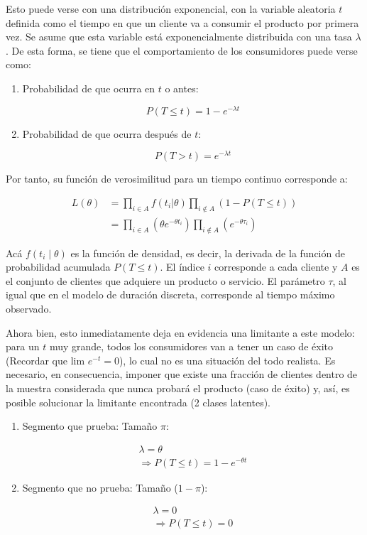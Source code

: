 \documentclass[
]{book}
\begin{document}
Esto puede verse con una distribución exponencial, con la variable
aleatoria \(t\) definida como el tiempo en que un cliente va a consumir el
producto por primera vez. Se asume que esta variable está
exponencialmente distribuida con una tasa \(\lambda\). De esta forma, se
tiene que el comportamiento de los consumidores puede verse como:

\begin{enumerate}
\def\labelenumi{\arabic{enumi}.}
\item
  Probabilidad de que ocurra en \(t\) o antes:

  \[P(T \leq t) = 1 - e^{-\lambda t}\]
\item
  Probabilidad de que ocurra después de \(t\):

  \[
  P(T > t) = e^{-\lambda t}
  \]
\end{enumerate}

Por tanto, su función de verosimilitud para un tiempo continuo
corresponde a:

\[
\begin{aligned}
L(\theta) &= \prod_{i \in A} f(t_i | \theta) \prod_{i \notin A} (1 - P(T \leq t)) \\
&= \prod_{i \in A} (\theta e^{-\theta t_i}) \prod_{i \notin A} (e^{-\theta \tau_i})
\end{aligned}
\]

Acá \(f(t_i \mid \theta)\) es la función de densidad, es decir, la
derivada de la función de probabilidad acumulada \(P(T \leq t)\). El
índice \(i\) corresponde a cada cliente y \(A\) es el conjunto de clientes
que adquiere un producto o servicio. El parámetro \(\tau\), al igual que
en el modelo de duración discreta, corresponde al tiempo máximo
observado.

Ahora bien, esto inmediatamente deja en evidencia una limitante a este
modelo: para un \(t\) muy grande, todos los consumidores van a tener un
caso de éxito (Recordar que \(\text{lim } e^{-t} = 0\)), lo cual no es una
situación del todo realista. Es necesario, en consecuencia, imponer que
existe una fracción de clientes dentro de la muestra considerada que
nunca probará el producto (caso de éxito) y, así, es posible solucionar
la limitante encontrada (2 clases latentes).

\begin{enumerate}
\def\labelenumi{\arabic{enumi}.}
\item
  Segmento que prueba: Tamaño \(\pi\):

  \[
  \begin{array}{c}
  \lambda = \theta\\
  \Rightarrow P(T \leq t) = 1 - e^{-\theta t}
  \end{array}
  \]
\item
  Segmento que no prueba: Tamaño (\(1-\pi\)):

  \[
  \begin{array}{c}
  \lambda = 0\\
  \Rightarrow P(T \leq t) = 0
  \end{array}
  \]
\end{enumerate}
\end{document}

